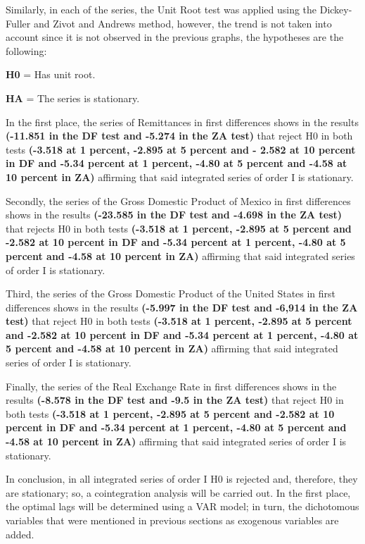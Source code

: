 \documentclass[12pt,english, spanish]{smfart}
\begin{document}
Similarly, in each of the series, the Unit Root test was applied using the Dickey-Fuller and Zivot and Andrews method, however, the trend is not taken into account since it is not observed in the previous graphs, the hypotheses are the following:\par
\begin{center}
\textbf{H0} = Has unit root.\par
\textbf{HA} = The series is stationary.
\end{center}
In the first place, the series of Remittances in first differences shows in the results \textbf{(-11.851 in the DF test and -5.274 in the ZA test)} that reject H0 in both tests \textbf{(-3.518 at 1 percent, -2.895 at 5 percent and - 2.582 at 10 percent in DF and -5.34 percent at 1 percent, -4.80 at 5 percent and -4.58 at 10 percent in ZA)} affirming that said integrated series of order I is stationary.\par
Secondly, the series of the Gross Domestic Product of Mexico in first differences shows in the results \textbf{(-23.585 in the DF test and -4.698 in the ZA test)} that rejects H0 in both tests \textbf{(-3.518 at 1 percent, -2.895 at 5 percent and -2.582 at 10 percent in DF and -5.34 percent at 1 percent, -4.80 at 5 percent and -4.58 at 10 percent in ZA)} affirming that said integrated series of order I is stationary.\par
Third, the series of the Gross Domestic Product of the United States in first differences shows in the results \textbf{(-5.997 in the DF test and -6,914 in the ZA test)} that reject H0 in both tests \textbf{(-3.518 at 1 percent, -2.895 at 5 percent and -2.582 at 10 percent in DF and -5.34 percent at 1 percent, -4.80 at 5 percent and -4.58 at 10 percent in ZA)} affirming that said integrated series of order I is stationary.\par
Finally, the series of the Real Exchange Rate in first differences shows in the results \textbf{(-8.578 in the DF test and -9.5 in the ZA test)} that reject H0 in both tests \textbf{(-3.518 at 1 percent, -2.895 at 5 percent and -2.582 at 10 percent in DF and -5.34 percent at 1 percent, -4.80 at 5 percent and -4.58 at 10 percent in ZA)} affirming that said integrated series of order I is stationary.\par
In conclusion, in all integrated series of order I H0 is rejected and, therefore, they are stationary; so, a cointegration analysis will be carried out. In the first place, the optimal lags will be determined using a VAR model; in turn, the dichotomous variables that were mentioned in previous sections as exogenous variables are added.\par
\end{document}
